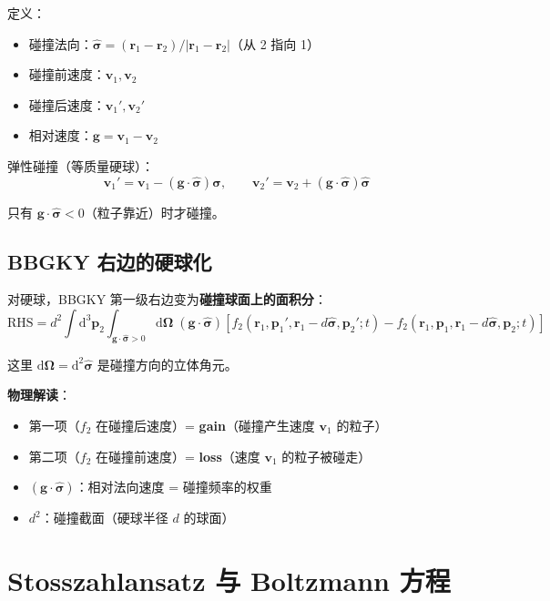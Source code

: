 \documentclass[11pt,a4paper]{article}
\newcommand{\ri}{\mathbf{r}}
\newcommand{\piu}{\mathbf{p}}
\newcommand{\vi}{\mathbf{v}}
\newcommand{\Om}{\boldsymbol{\Omega}}
\begin{document}
定义：
\begin{itemize}
\item 碰撞法向：$\hat{\boldsymbol{\sigma}} = (\ri_1 - \ri_2)/|\ri_1-\ri_2|$（从 2 指向 1）
\item 碰撞前速度：$\vi_1, \vi_2$
\item 碰撞后速度：$\vi_1', \vi_2'$
\item 相对速度：$\mathbf{g} = \vi_1 - \vi_2$
\end{itemize}

弹性碰撞（等质量硬球）：
\begin{equation}
\vi_1' = \vi_1 - (\mathbf{g}\cdot\hat{\boldsymbol{\sigma}})\hat{\boldsymbol{\sigma}}, \qquad
\vi_2' = \vi_2 + (\mathbf{g}\cdot\hat{\boldsymbol{\sigma}})\hat{\boldsymbol{\sigma}}
\end{equation}

只有 $\mathbf{g}\cdot\hat{\boldsymbol{\sigma}} < 0$（粒子靠近）时才碰撞。

\subsection{BBGKY 右边的硬球化}

对硬球，BBGKY 第一级右边变为\textbf{碰撞球面上的面积分}：
\begin{equation}
\text{RHS} = d^2\int \mathrm{d}^3\piu_2 \int_{\mathbf{g}\cdot\hat{\boldsymbol{\sigma}}>0} \mathrm{d}\Om\; (\mathbf{g}\cdot\hat{\boldsymbol{\sigma}})\left[f_2(\ri_1,\piu_1',\ri_1-d\hat{\boldsymbol{\sigma}},\piu_2';t) - f_2(\ri_1,\piu_1,\ri_1-d\hat{\boldsymbol{\sigma}},\piu_2;t)\right]
\end{equation}

这里 $\mathrm{d}\Om = \mathrm{d}^2\hat{\boldsymbol{\sigma}}$ 是碰撞方向的立体角元。

\textbf{物理解读}：
\begin{itemize}
\item 第一项（$f_2$ 在碰撞后速度）= \textbf{gain}（碰撞产生速度 $\vi_1$ 的粒子）
\item 第二项（$f_2$ 在碰撞前速度）= \textbf{loss}（速度 $\vi_1$ 的粒子被碰走）
\item $(\mathbf{g}\cdot\hat{\boldsymbol{\sigma}})$：相对法向速度 = 碰撞频率的权重
\item $d^2$：碰撞截面（硬球半径 $d$ 的球面）
\end{itemize}

\section{Stosszahlansatz 与 Boltzmann 方程}
\end{document}
